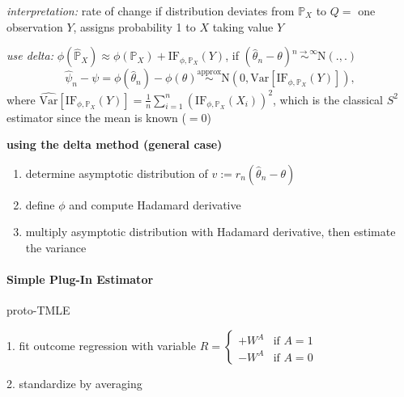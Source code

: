 \documentclass[8pt,twoside]{extarticle}
\begin{document}
\begin{multicols}{2}
\noindent \textit{interpretation:} rate of change if distribution deviates from $\mathbb{P}_X$ to $Q=$  one observation $Y$, assigns probability 1 to $X$ taking  value $Y$ 

\noindent \textit{use delta:} $\phi(\hat{\mathbb{P}}_X) \approx \phi(\mathbb{P}_X) + \mathrm{IF}_{\phi, \mathbb{P}_X}(Y)$, if $(\hat{\theta}_n - \theta) \overset{n\to\infty}{\sim} \mathrm{N}(.,.)$
$$\hat{\psi}_n - \psi = \phi(\hat{\theta}_n)-\phi(\theta) \overset{\text{approx}}{\sim} \mathrm{N}\left(0, \mathrm{Var}[\mathrm{IF}_{\phi, \mathbb{P}_X}(Y)]\right),$$
where
$\widehat{\mathrm{Var}}[\mathrm{IF}_{\phi, \mathbb{P}_X}(Y)] = \frac{1}{n}\sum_{i=1}^n \left(\mathrm{IF}_{\phi, \mathbb{P}_X}(X_i)\right)^2$, which is the classical $S^2$ estimator since the mean is known ($=0$)

\noindent \textbf{using the delta method (general case)}
\begin{enumerate}[leftmargin=*, itemsep=0em, topsep=0pt, partopsep=0pt,parsep=0pt]
\item determine asymptotic distribution of $v:=r_n(\hat{\theta}_n -\theta)$
\item define $\phi$ and compute Hadamard derivative
\item multiply asymptotic distribution with Hadamard derivative, then estimate the variance
\end{enumerate}


\paragraph{Simple Plug-In Estimator} proto-TMLE   \vspace{-0.3em}

1. fit outcome regression with variable $R = \begin{cases} +W^A & \text{if } A{=}1 \\ -W^A & \text{if } A{=}0 \end{cases}$ \vspace{-0.9em}

2. standardize by averaging


\vspace{0.2em}
\noindent \colorbox{lightgray!20!white}{\begin{minipage}{28em}


\end{minipage}}
\end{multicols}
\end{document}
